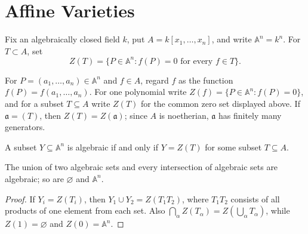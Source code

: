 
\section{Affine Varieties}

Fix an algebraically closed field $k$, put $A=k[x_1,\ldots,x_n]$, and write
\(\mathbb A^n=k^n\).  For $T\subset A$, set
\[
Z(T)=\{P\in\mathbb A^n:f(P)=0\text{ for every }f\in T\}.
\]

\begin{definition}
\label{def:ha-ch1-polynomial-evaluation}
\leanok
For $P=(a_1,\ldots,a_n)\in\mathbb A^n$ and $f\in A$, regard $f$ as the function
$f(P)=f(a_1,\ldots,a_n)$.  For one polynomial write
$Z(f)=\{P\in\mathbb A^n:f(P)=0\}$, and for a subset $T\subseteq A$ write $Z(T)$
for the common zero set displayed above.  If $\mathfrak a=(T)$, then
$Z(T)=Z(\mathfrak a)$; since $A$ is noetherian, $\mathfrak a$ has finitely many generators.
\end{definition}

\begin{definition}
\label{def:ha-ch1-algebraic-set}
\leanok
A subset $Y\subseteq\mathbb A^n$ is algebraic if and only if $Y=Z(T)$ for some subset
$T\subseteq A$.
\end{definition}

\begin{proposition}
\label{prop:ha-ch1-1-1}
The union of two algebraic sets and every intersection of algebraic sets are algebraic; so are
$\varnothing$ and $\mathbb A^n$.
\end{proposition}
\begin{proof}
If $Y_i=Z(T_i)$, then $Y_1\cup Y_2=Z(T_1T_2)$, where $T_1T_2$ consists of all products
of one element from each set.  Also $\bigcap_\alpha Z(T_\alpha)=Z(\bigcup_\alpha T_\alpha)$,
while $Z(1)=\varnothing$ and $Z(0)=\mathbb A^n$.
\end{proof}

